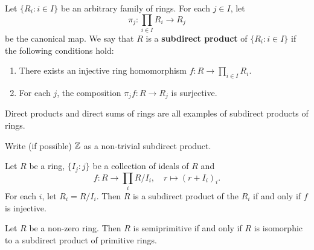 
\begin{definition}
    Let $\{R_i:i\in I\}$ be an arbitrary family of rings. For each 
    $j\in I$, let 
    \[
    \pi_j\colon \prod_{i\in I}R_i\to R_j
    \]
    be the
    canonical map. We say that $R$ is a \textbf{subdirect product}
    of $\{R_i:i\in I\}$ if the following conditions hold:
    \begin{enumerate}
        \item There exists an injective ring homomorphism $f\colon R\to \prod_{i\in I}R_i$. 
        \item For each $j$, the composition 
        $\pi_jf\colon R\to R_j$ is surjective. 
    \end{enumerate}
\end{definition}

Direct products and direct sums of rings are all examples of subdirect products of rings. 

\begin{exercise}
\label{xca:Z_semiprimitive}
    Write (if possible) $\mathbb{Z}$ as a non-trivial subdirect product. 
\end{exercise}

\begin{example}
    Let $R$ be a ring,  
    $\{I_j:j\}$ be a collection of ideals of $R$ and
    \[
    f\colon R\to \prod_i R/I_i,
    \quad
    r\mapsto (r+I_i)_i.
    \]
    For each
    $i$, let $R_i=R/I_i$. Then $R$ is a subdirect product
    of the $R_i$ if and only if $f$ is injective. 
\end{example}



\begin{theorem}
	\label{thm:subdirecto}
	Let $R$ be a non-zero ring. Then $R$ is semiprimitive if and only if
	$R$ is isomorphic to a subdirect product of primitive rings. 
\end{theorem}

